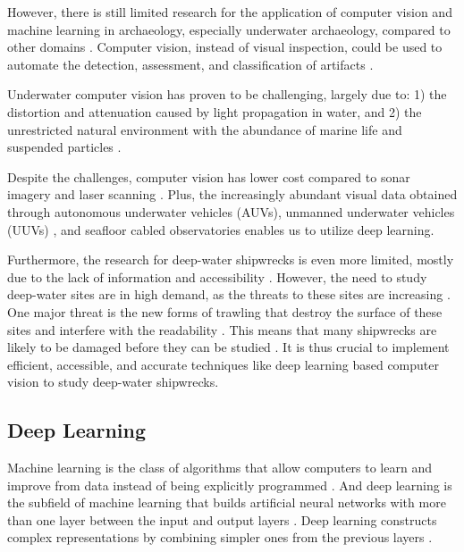 \documentclass[a4paper,11pt,oneside]{article}
\begin{document}
  However, there is still limited research for the application of computer vision and machine learning in archaeology,
  especially underwater archaeology, compared to other domains \cite{maaten2007computer, qin2015underwater}.
  Computer vision, instead of visual inspection, could be used to automate the detection, assessment, and classification
  of artifacts \cite{maaten2007computer}.

  Underwater computer vision has proven to be challenging, largely due to: 1) the distortion and attenuation caused by
  light propagation in water, and 2) the unrestricted natural environment with the abundance of marine life and suspended
  particles \cite{qin2015underwater, rizzini2015investigation, lu2017underwater}.

  Despite the challenges, computer vision has lower cost \cite{rizzini2015investigation} compared to sonar imagery
  \cite{abu2019statistically} and laser scanning \cite{gordon1992use}. Plus, the increasingly abundant visual data obtained
  through autonomous underwater vehicles (AUVs), unmanned underwater vehicles (UUVs)
  \cite{lu2017underwater, moniruzzaman2017deep}, and seafloor cabled observatories \cite{qin2015underwater} enables us
  to utilize deep learning.

  Furthermore, the research for deep-water shipwrecks is even more limited, mostly due to the lack of information and
  accessibility \cite{drap2015underwater}. However, the need to study deep-water sites are in high demand, as the threats
  to these sites are increasing \cite{drap2015underwater}. One major threat is the new forms of trawling that destroy the
  surface of these sites and interfere with the readability \cite{drap2015underwater}. This means that many
  shipwrecks are likely to be damaged before they can be studied \cite{drap2015underwater}. It is thus crucial to implement
  efficient, accessible, and accurate techniques like deep learning based computer vision to study deep-water shipwrecks.

  \subsection{Deep Learning}

  Machine learning is the class of algorithms that allow computers to learn and improve from data instead of being
  explicitly programmed \cite{samuel1959some, geron2019hands}. And deep learning is the subfield of machine learning that
  builds artificial neural networks with more than one layer between the input and output layers
  \cite{geron2019hands, burkov2019hundred, zhang2018definition}. Deep learning constructs complex representations by
  combining simpler ones from the previous layers \cite{goodfellow2016deep}.
\end{document}

